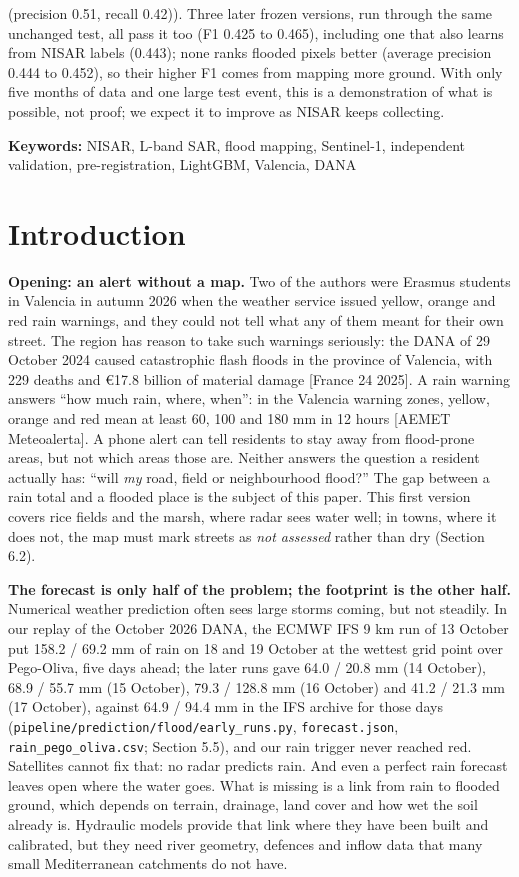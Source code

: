 \documentclass[10pt,twocolumn]{article}
\begin{document}
(precision 0.51, recall 0.42)). Three later frozen versions, run through the same unchanged test, all pass it too (F1 0.425 to 0.465), including one that also learns from NISAR labels (0.443); none ranks flooded pixels better (average precision 0.444 to 0.452), so their higher F1 comes from mapping more ground. With only five months of data and one large test event, this is a demonstration of what is possible, not proof; we expect it to improve as NISAR keeps collecting.

\textbf{Keywords:} NISAR, L-band SAR, flood mapping, Sentinel-1, independent validation, pre-registration, LightGBM, Valencia, DANA

\section{Introduction}
\textbf{Opening: an alert without a map.} Two of the authors were Erasmus students in Valencia in autumn 2026 when the weather service issued yellow, orange and red rain warnings, and they could not tell what any of them meant for their own street. The region has reason to take such warnings seriously: the DANA of 29 October 2024 caused catastrophic flash floods in the province of Valencia, with 229 deaths and €17.8 billion of material damage [France 24 2025]. A rain warning answers ``how much rain, where, when'': in the Valencia warning zones, yellow, orange and red mean at least 60, 100 and 180 mm in 12 hours [AEMET Meteoalerta]. A phone alert can tell residents to stay away from flood-prone areas, but not which areas those are. Neither answers the question a resident actually has: ``will \emph{my} road, field or neighbourhood flood?'' The gap between a rain total and a flooded place is the subject of this paper. This first version covers rice fields and the marsh, where radar sees water well; in towns, where it does not, the map must mark streets as \emph{not assessed} rather than dry (Section 6.2).

\textbf{The forecast is only half of the problem; the footprint is the other half.} Numerical weather prediction often sees large storms coming, but not steadily. In our replay of the October 2026 DANA, the ECMWF IFS 9 km run of 13 October put 158.2 / 69.2 mm of rain on 18 and 19 October at the wettest grid point over Pego-Oliva, five days ahead; the later runs gave 64.0 / 20.8 mm (14 October), 68.9 / 55.7 mm (15 October), 79.3 / 128.8 mm (16 October) and 41.2 / 21.3 mm (17 October), against 64.9 / 94.4 mm in the IFS archive for those days (\texttt{pipeline/\allowbreak{}prediction/\allowbreak{}flood/\allowbreak{}early\_\allowbreak{}runs.\allowbreak{}py}, \texttt{forecast.\allowbreak{}json}, \texttt{rain\_\allowbreak{}pego\_\allowbreak{}oliva.\allowbreak{}csv}; Section 5.5), and our rain trigger never reached red. Satellites cannot fix that: no radar predicts rain. And even a perfect rain forecast leaves open where the water goes. What is missing is a link from rain to flooded ground, which depends on terrain, drainage, land cover and how wet the soil already is. Hydraulic models provide that link where they have been built and calibrated, but they need river geometry, defences and inflow data that many small Mediterranean catchments do not have.
\end{document}
